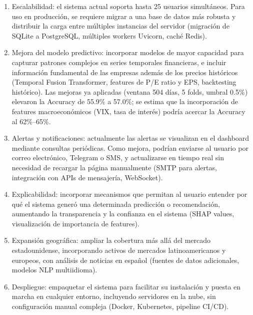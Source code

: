   \begin{enumerate}
      \item Escalabilidad: el sistema actual soporta hasta 25 usuarios simultáneos. Para uso  
  en producción, se requiere migrar a una base de datos más robusta y distribuir la carga     
  entre múltiples instancias del servidor (migración de SQLite a PostgreSQL, múltiples workers Uvicorn, caché Redis).
      \item Mejora del modelo predictivo: incorporar modelos de mayor capacidad para capturar patrones complejos en series temporales financieras, e incluir información fundamental de las empresas además de los precios históricos (Temporal Fusion Transformer, features de P/E ratio y EPS, backtesting histórico). Las mejoras ya aplicadas (ventana 504 días, 5 folds, umbral 0.5\%) elevaron la Accuracy de 55.9\% a 57.0\%; se estima que la incorporación de features macroeconómicos (VIX, tasa de interés) podría acercar la Accuracy al 62\%--65\%.
      \item Alertas y notificaciones: actualmente las alertas se visualizan en el dashboard   
  mediante consultas periódicas. Como mejora, podrían enviarse al usuario por correo
  electrónico, Telegram o SMS, y actualizarse en tiempo real sin necesidad de recargar la     
  página manualmente (SMTP para alertas, integración con APIs de mensajería, WebSocket).      
      \item Explicabilidad: incorporar mecanismos que permitan al usuario entender por qué el 
  sistema generó una determinada predicción o recomendación, aumentando la transparencia y la 
  confianza en el sistema (SHAP values, visualización de importancia de features).
      \item Expansión geográfica: ampliar la cobertura más allá del mercado estadounidense,   
  incorporando activos de mercados latinoamericanos y europeos, con análisis de noticias en   
  español (fuentes de datos adicionales, modelos NLP multiidioma).
      \item Despliegue: empaquetar el sistema para facilitar su instalación y puesta en marcha   en cualquier entorno, incluyendo servidores en la nube, sin configuración manual compleja  
  (Docker, Kubernetes, pipeline CI/CD).
  \end{enumerate}